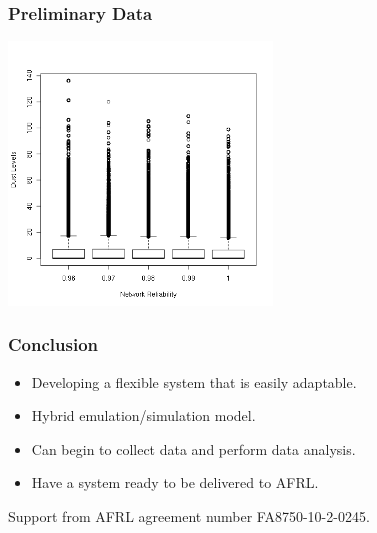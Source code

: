 \documentclass{beamer}
\begin{document}
\begin{frame}
  \frametitle{Preliminary Data}

  \includegraphics[height=7cm]{dustLevelsBoxplot}

\end{frame}


\begin{frame}
  \frametitle{Conclusion}

  \begin{itemize}
  \item Developing a flexible system that is easily adaptable.
  \item Hybrid emulation/simulation model.
  \item Can begin to collect data and perform data analysis.
  \item Have a system ready to be delivered to AFRL.
  \end{itemize}

  Support from AFRL agreement number FA8750-10-2-0245.
  
\end{frame}
\end{document}
